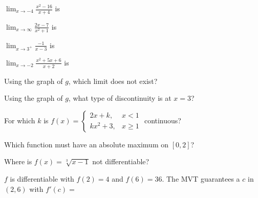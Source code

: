 \begin{exo}{}
$\displaystyle\lim_{x\to-4}\frac{x^2-16}{x+4}$ is
\end{exo}
\begin{exo}{}
$\displaystyle\lim_{x\to\infty}\frac{2x-7}{x^2+1}$ is
\end{exo}
\begin{exo}{}
$\displaystyle\lim_{x\to3^+}\frac{-1}{x-3}$ is
\end{exo}
\begin{exo}{}
$\displaystyle\lim_{x\to-2}\frac{x^2+5x+6}{x+2}$ is
\end{exo}
\ggraph
\begin{exo}{}
Using the graph of $g$, which limit does not exist?
\end{exo}
\begin{exo}{}
Using the graph of $g$, what type of discontinuity is at $x=3$?
\end{exo}
\begin{exo}{}
For which $k$ is $f(x)=\begin{cases}2x+k, & x<1\\ kx^2+3, & x\ge1\end{cases}$ continuous?
\end{exo}
\begin{exo}{}
Which function must have an absolute maximum on $[0,2]$?
\end{exo}
\begin{exo}{}
Where is $f(x)=\sqrt[3]{x-1}$ not differentiable?
\end{exo}
\begin{exo}{}
$f$ is differentiable with $f(2)=4$ and $f(6)=36$. The MVT guarantees a $c$ in $(2,6)$ with $f'(c)=$
\end{exo}

